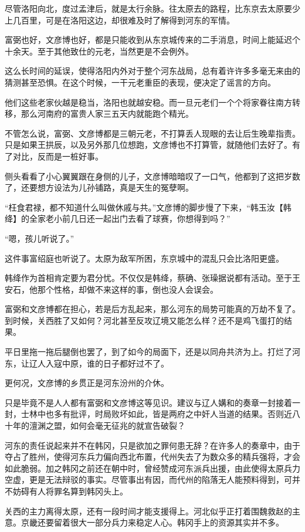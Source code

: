 尽管洛阳向北，度过孟津后，就是太行余脉。往太原去的路程，比东京去太原要少上几百里，可是在洛阳这边，却很难及时了解得到河东的军情。

富弼也好，文彦博也好，都是只能收到从东京城传来的二手消息，时间上能延迟个十余天。至于其他致仕的元老，当然更是不会例外。

这么长时间的延误，使得洛阳内外对于整个河东战局，总有着许许多多毫无来由的猜测甚至恐惧。在这个时候，一干元老重臣的表现，便决定了谣言的方向。

他们这些老家伙越是稳当，洛阳也就越安稳。而一旦元老们一个个将家眷往南方转移，那么河南府的富贵人家三五天内就能跑个精光。

不管怎么说，富弼、文彦博都是三朝元老，不打算丢人现眼的去让后生晚辈指责。只是如果王拱辰，以及另外那几位想跑，文彦博也不打算管，就随他们去好了。有了对比，反而是一桩好事。

侧头看看了小心翼翼跟在身侧的儿子，文彦博暗暗叹了一口气，他都到了这把岁数了，还要想方设法为儿孙铺路，真是天生的冤孽啊。

“枉食君禄，都不知道什么叫做休戚与共。”文彦博的脚步慢了下来，“韩玉汝【韩绛】的全家老小前几日还一起出门去看了球赛，你想得到吗？”

“嗯，孩儿听说了。”

这件事富绍庭也听说了。太原为敌军所困，东京城中的混乱只会比洛阳更盛。

韩绛作为首相肯定要为君分忧。不仅仅是韩绛，蔡确、张璪据说都有活动。至于王安石，他那个性格，却做不来这样的事，倒也没人会误会。

富弼和文彦博都在担心，若是后方乱起来，那么河东的局势可能真的万劫不复了。到时候，关西胜了又如何？河北甚至反攻辽境又能怎么样？还不是鸡飞蛋打的结果。

平日里拖一拖后腿倒也罢了，到了如今的局面下，还是以同舟共济为上。打烂了河东，让辽人入寇中原，谁的日子都好过不了。

更何况，文彦博的乡贯正是河东汾州的介休。

只是毕竟不是人人都有富弼和文彦博这等见识。建议与辽人媾和的奏章一封接着一封，士林中也多有批评，时局败坏如此，皆是两府之中奸人当道的结果。否则近八十年的澶渊之盟，如何会毫无征兆的就宣告破裂？

河东的责任说起来并不在韩冈，只是欲加之罪何患无辞？在许多人的奏章中，由于夺占了胜州，使得河东兵力偏向西北布置，代州失去了为数众多的精兵强将，才会如此脆弱。加之韩冈之前还在朝中时，曾经赞成河东派兵出援，由此使得太原兵力空虚，更是无法辩驳的事实。尽管事出有因，而代州的陷落无人能预料得到，可并不妨碍有人将罪名算到韩冈头上。

关西的主力离得太原，还有一段时间才能支援得上。河北似乎正打着围魏救赵的主意。京畿还要留着很大一部分兵力来稳定人心。韩冈手上的资源其实并不多。

